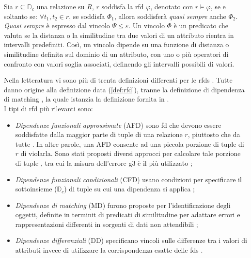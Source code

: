 Sia $r\subseteq\mathbb{D}_c$ una relazione su $R$, $r$ soddisfa la \acrshort{rfd} $\varphi$, denotato con $r\models\varphi$, se e soltanto se: $\forall t_1,t_2 \in r$, se soddisfa $\Phi_1$, allora soddisfer\`{a} \textit{quasi sempre} anche $\Phi_2$. \textit{Quasi sempre} \`{e} espresso dal vincolo $\Psi\leq\varepsilon$. Un vincolo $\Phi$ \`{e} un predicato che valuta se la distanza o la similitudine tra due valori di un attributo rientra in intervalli predefiniti. Cos\`{i}, un vincolo dipende su una funzione di distanza o similitudine definita sul dominio di un attributo, con uno o pi\`{u} operatori di confronto con valori soglia associati, definendo gli intervalli possibili di valori.\par
Nella letteratura vi sono pi\`{u} di trenta definizioni differenti per le \acrshort{rfds} \cite{rfdsurvey}. Tutte danno origine alla definizione data (\ref{def:rfd}), tranne la definizione di dipendenza di matching \cite{dynamicconstraints}, la quale istanzia la definizione fornita in \cite{rfdsurvey}.
\\I tipi di \acrshort{rfd} pi\`{u} rilevanti sono:
\begin{itemize}
    \item \textit{Dipendenze funzionali approssimate} (AFD) sono \acrshort{fd} che devono essere soddisfatte dalla maggior parte di tuple di una relazione $r$, piuttosto che da tutte \cite{approximateinferencefd}. In altre parole, una AFD consente ad una piccola porzione di tuple di $r$ di violarla. Sono stati proposti diversi approcci per calcolare tale porzione di tuple \cite{approx4fd}, tra cui la misura dell'errore g3 \`{e} il pi\`{u} utilizzato \cite{approximateinferencefd};
    \item \textit{Dipendenze funzionali condizionali} (CFD) usano condizioni per specificare il sottoinsieme ($\mathbb{D}_c$) di tuple su cui una dipendenza si applica \cite{conditionalfd4datacleaning};
    \item \textit{Dipendenze di matching} (MD) furono proposte per l'identificazione degli oggetti, definite in terminit di predicati di similitudine per adattare errori e rappresentazioni differenti in sorgenti di dati non attendibili \cite{dynamicconstraints};
    \item \textit{Dipendenze differenziali} (DD) specificano vincoli sulle differenze tra i valori di attributi invece di utilizzare la corrispondenza esatte delle \acrshort{fds} \cite{differentialdependencies}.
\end{itemize}

